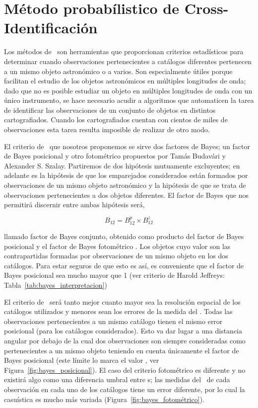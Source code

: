 \section{Método probabílistico de Cross-Identificación}\label{sec:4_cross_identificacion}

Los métodos de \cross\ son herramientas que proporcionan criterios estadísticos para determinar cuando observaciones pertenecientes a catálogos diferentes pertenecen a un mismo objeto astronómico o a varios. Son especialmente útiles porque facilitan el estudio de los objetos astronómicos en múltiples longitudes de onda; dado que no es posible estudiar un objeto en múltiples longitudes de onda con un único instrumento, se hace necesario acudir a algoritmos que automaticen la tarea de identificar las observaciones de un conjunto de objetos en distintos cartografiados. Cuando los cartografiados cuentan con cientos de miles de observaciones esta tarea resulta imposible de realizar de otro modo. 

El criterio de \cross\ que nosotros proponemos se sirve dos factores de Bayes; un factor de Bayes posicional y otro fotométrico propuestos por Tamás Budavári y Alexander S. Szalay. Partiremos de dos hipótesis mutuamente excluyentes; en adelante  es la hipótesis de que los emparejados considerados están formados por observaciones de un mismo objeto astronómico y  la hipótesis de que se trata de observaciones pertenecientes a dos objetos diferentes. El factor de Bayes que nos permitirá discernir entre ambas hipótesis será,

\vspace{-3mm}

\begin{equation}
    B_{12}= B^{p}_{12}\times B^{z}_{12}
\end{equation}

llamado factor de Bayes conjunto, obtenido como producto del factor de Bayes posicional  y el factor de Bayes fotométrico . Los objetos cuyo valor  son las contrapartidas formadas por observaciones de un mismo objeto en los dos catálogos. Para estar seguros de que esto es así, es conveniente que el factor de Bayes posicional sea mucho mayor que 1 (ver criterio de Harold Jeffreys: Tabla~\ref{tab:bayes_interpretacion})

El criterio de \cross\ será tanto mejor cuanto mayor sea la resolución espacial de los catálogos utilizados y menores sean los errores de la medida del \rt. Todas las observaciones pertenecientes a un mismo catálogo tienen el mismo error posicional (para los catálogos considerados). Esto va dar lugar a una distancia angular  por debajo de la cual dos observaciones son siempre consideradas como pertenecientes a un mismo objeto teniendo en cuenta únicamente el factor de Bayes posicional (este límite lo marca el valor , ver Figura~\ref{fig:bayes_posicional}). 
El caso del criterio fotométrico es diferente y no existirá algo como una diferencia umbral entre \rt s; las medidas del \rt\ de cada observación en cada uno de los catálogos tiene un error diferente, por lo cual la casuística es mucho más variada (Figura~\ref{fig:bayes_fotométrico}). 

